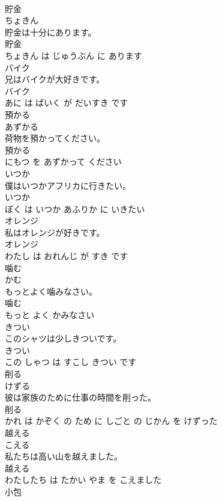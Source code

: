 \documentclass[8pt]{extreport}
\begin{document}
\begin{CJK}{UTF8}{min}
\\	貯金	
\\	ちょきん			
\\	貯金は十分にあります。	
\\	貯金 
\\	ちょきん は じゅうぶん に あります			
\\	バイク	
\\	兄はバイクが大好きです。	
\\	バイク 
\\	あに は ばいく が だいすき です			
\\	預かる	
\\	あずかる			
\\	荷物を預かってください。	
\\	預かる 
\\	にもつ を あずかって ください			
\\	いつか	
\\	僕はいつかアフリカに行きたい。	
\\	いつか 
\\	ぼく は いつか あふりか に いきたい			
\\	オレンジ	
\\	私はオレンジが好きです。	
\\	オレンジ 
\\	わたし は おれんじ が すき です			
\\	噛む	
\\	かむ			
\\	もっとよく噛みなさい。	
\\	噛む 
\\	もっと よく かみなさい			
\\	きつい	
\\	このシャツは少しきついです。	
\\	きつい 
\\	この しゃつ は すこし きつい です			
\\	削る	
\\	けずる			
\\	彼は家族のために仕事の時間を削った。	
\\	削る 
\\	かれ は かぞく の ため に しごと の じかん を けずった			
\\	越える	
\\	こえる			
\\	私たちは高い山を越えました。	
\\	越える 
\\	わたしたち は たかい やま を こえました			
\\	小包	

\end{CJK}
\end{document}
